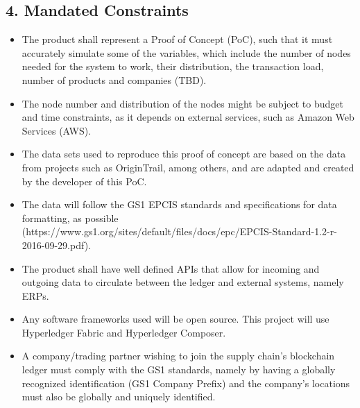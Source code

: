 \subsection*{4. Mandated Constraints}
    \begin{itemize}
		\item The product shall represent a Proof of Concept (PoC), such that it must accurately simulate some of the variables, which include the number of nodes needed for the system to work, their distribution, the transaction load, number of products and companies (TBD).
		\item The node number and distribution of the nodes might be subject to budget and time constraints, as it depends on external services, such as Amazon Web Services (AWS).
		\item The data sets used to reproduce this proof of concept are based on the data from projects such as OriginTrail, among others, and are adapted and created by the developer of this PoC.
		\item The data will follow the GS1 EPCIS standards and specifications for data formatting, as possible (https://www.gs1.org/sites/default/files/docs/epc/EPCIS-Standard-1.2-r-2016-09-29.pdf).
		\item The product shall have well defined APIs that allow for incoming and outgoing data to circulate between the ledger and external systems, namely ERPs.
		\item Any software frameworks used will be open source. This project will use Hyperledger Fabric and Hyperledger Composer.
		\item A company/trading partner wishing to join the supply chain's blockchain ledger must comply with the GS1 standards, namely by having a globally recognized identification (GS1 Company Prefix) and the company's locations must also be globally and uniquely identified.
        \end{itemize}
        

